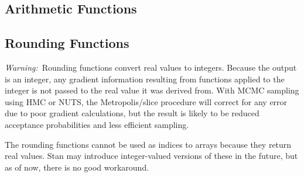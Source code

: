 \subsection{Arithmetic Functions}

%
\begin{description}
%
\end{description}


\subsection{Rounding Functions}

{\it Warning:}\ Rounding functions convert real values to integers.
Because the output is an integer, any gradient information resulting
from functions applied to the integer is not passed to the real value
it was derived from.  With MCMC sampling using HMC or NUTS, the
Metropolis/slice procedure will correct for any error due to poor
gradient calculations, but the result is likely to be reduced
acceptance probabilities and less efficient sampling.

The rounding functions cannot be used as indices to arrays because
they return real values.  Stan may introduce integer-valued versions
of these in the future, but as of now, there is no good workaround.

